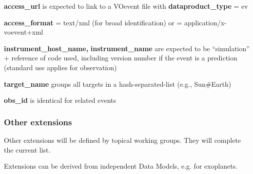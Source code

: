 \documentclass[11pt,a4paper]{ivoa}
\begin{document}
\textbf{access\_url} is expected to link to a VOevent file with
\textbf{dataproduct\_type} = ev

\textbf{access\_format} = text/xml (for broad identification) or =
application/x-voevent+xml

\textbf{instrument\_host\_name,} \textbf{instrument\_name} are expected
to be ``simulation'' + reference of code used, including version number
if the event is a prediction (standard use applies for observation)

\textbf{target\_name} groups all targets in a hash-separated-list
(e.g., Sun\#Earth)

\textbf{obs\_id} is identical for related events

\subsubsection{Other extensions}

Other extensions will be defined by topical working groups.
They will complete the current list.

Extensions can be derived from independent Data Models,
e.g. for exoplanets.



\end{document}
